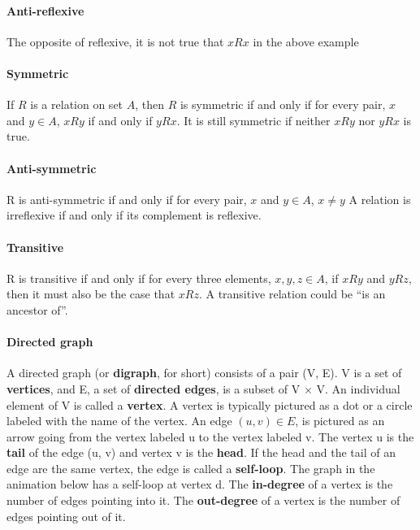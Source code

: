 \documentclass[a4paper]{article}
\begin{document}
\paragraph{Anti-reflexive} The opposite of reflexive, it is not true that $xRx$ in the above example
\paragraph{Symmetric} If $R$ is a relation on set $A$, then $R$ is symmetric if and only if for every pair, $x$ and $y \in A$, $xRy$ if and only if $yRx$. It is still symmetric if neither $xRy$ nor $yRx$ is true.
\paragraph{Anti-symmetric} R is anti-symmetric if and only if for every pair, $x$ and $y \in A$, $x \neq y$ A relation is irreflexive if and only if its complement is reflexive.
\paragraph{Transitive} R is transitive if and only if for every three elements, $x, y, z \in A$, if $xRy$ and $yRz$, then it must also be the case that $xRz$. A transitive relation could be ``is an ancestor of''.
\paragraph{Directed graph} A directed graph (or \textbf{digraph}, for short) consists of a pair (V, E). V is a set of \textbf{vertices}, and E, a set of \textbf{directed edges}, is a subset of V × V. An individual element of V is called a \textbf{vertex}. A vertex is typically pictured as a dot or a circle labeled with the name of the vertex. An edge $(u, v) \in E$, is pictured as an arrow going from the vertex labeled u to the vertex labeled v. The vertex u is the \textbf{tail} of the edge (u, v) and vertex v is the \textbf{head}. If the head and the tail of an edge are the same vertex, the edge is called a \textbf{self-loop}. The graph in the animation below has a self-loop at vertex d. The \textbf{in-degree} of a vertex is the number of edges pointing into it. The \textbf{out-degree} of a vertex is the number of edges pointing out of it. 
\end{document}
